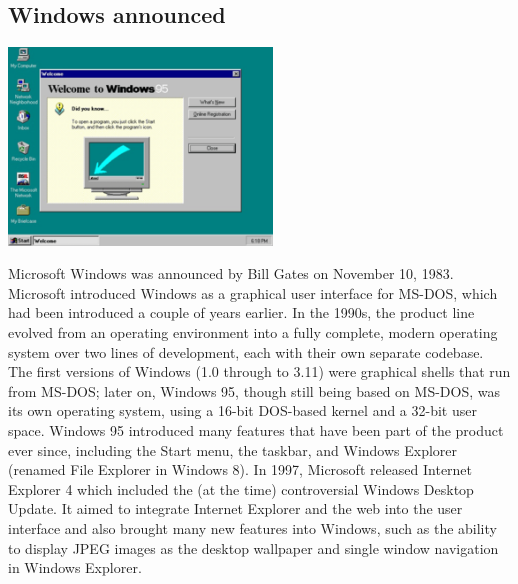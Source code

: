 \documentclass[11pt]{report}
\begin{document}
\subsection{Windows announced}
\vspace{2mm}\begin{center}\includegraphics[width=7cm]{./img/windows.png}\end{center}
Microsoft Windows was announced by Bill Gates on November 10, 1983. Microsoft introduced Windows as a graphical user interface for MS-DOS, which had been introduced a couple of years earlier. In the 1990s, the product line evolved from an operating environment into a fully complete, modern operating system over two lines of development, each with their own separate codebase.\\
The first versions of Windows (1.0 through to 3.11) were graphical shells that run from MS-DOS; later on, Windows 95, though still being based on MS-DOS, was its own operating system, using a 16-bit DOS-based kernel and a 32-bit user space. Windows 95 introduced many features that have been part of the product ever since, including the Start menu, the taskbar, and Windows Explorer (renamed File Explorer in Windows 8). In 1997, Microsoft released Internet Explorer 4 which included the (at the time) controversial Windows Desktop Update. It aimed to integrate Internet Explorer and the web into the user interface and also brought many new features into Windows, such as the ability to display JPEG images as the desktop wallpaper and single window navigation in Windows Explorer.

\end{document}
